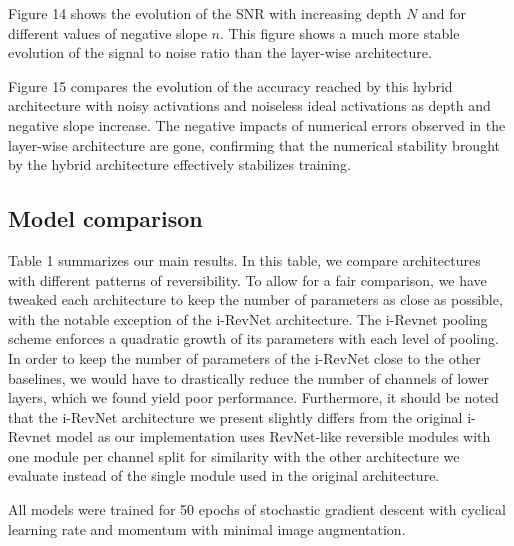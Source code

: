 \documentclass[twocolumn]{bmcart}
\begin{document}
Figure 14 shows the evolution of the SNR with increasing depth $N$ and for different values of negative slope $n$.
This figure shows a much more stable evolution of the signal to noise ratio than the layer-wise architecture. 

Figure 15 compares the evolution of the accuracy reached by this hybrid architecture with noisy activations and noiseless ideal activations as depth and negative slope increase.
The negative impacts of numerical errors observed in the layer-wise architecture are gone,
confirming that the numerical stability brought by the hybrid architecture effectively stabilizes training.


\subsection{Model comparison}

Table 1 summarizes our main results.
In this table, we compare architectures with different patterns of reversibility.
To allow for a fair comparison, we have tweaked each architecture to keep the number of parameters as close as possible,
with the notable exception of the i-RevNet architecture. 
The i-Revnet pooling scheme enforces a quadratic growth of its parameters with each level of pooling.
In order to keep the number of parameters of the i-RevNet close to the other baselines, we would have to drastically 
reduce the number of channels of lower layers, which we found yield poor performance. 
Furthermore, it should be noted that the i-RevNet architecture we present slightly differs from the original i-Revnet model
as our implementation uses RevNet-like reversible modules with one module per channel split for similarity with
the other architecture we evaluate instead of the single module used in the original architecture.

All models were trained for 50 epochs of stochastic gradient descent with cyclical learning rate and momentum \cite{smith2017super} with minimal image augmentation.
\end{document}
